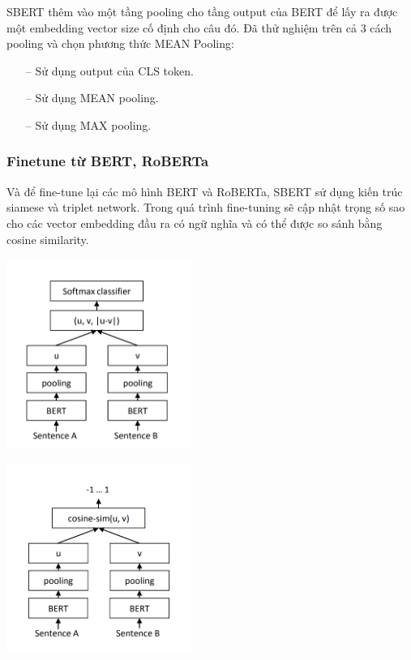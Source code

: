 \documentclass[a4paper, 12pt, openany]{book}
\begin{document}
SBERT thêm vào một tầng pooling cho tầng output của BERT để lấy ra được
một embedding vector size cố định cho câu đó. Đã thử nghiệm trên cả 3 cách pooling và chọn phương thức MEAN Pooling:

\begin{itemize}
    \item[--] Sử dụng output của CLS token.
    \item[--] Sử dụng MEAN pooling.
    \item[--] Sử dụng MAX pooling.
\end{itemize}

\subsubsection{Finetune từ BERT, RoBERTa}

Và để fine-tune lại các mô hình BERT và RoBERTa, SBERT sử dụng kiến trúc siamese và triplet network.
Trong quá trình fine-tuning sẽ cập nhật trọng số sao cho các vector embedding đầu ra có ngữ nghĩa và có thể được so sánh bằng cosine similarity.

    \begin{minipage}
        {14cm}
        \captionsetup{type=figure}
        \centering
        \includegraphics[width=6cm]{./assets/images/sbert-softmax.png}
        \label{fig:demo-register-1}
    \end{minipage}

    \begin{minipage}
        {14cm}
        \captionsetup{type=figure}
        \centering
        \includegraphics[width=6cm]{./assets/images/sbert-cosine.png}
        \label{fig:demo-register-2}
    \end{minipage}
\end{document}
